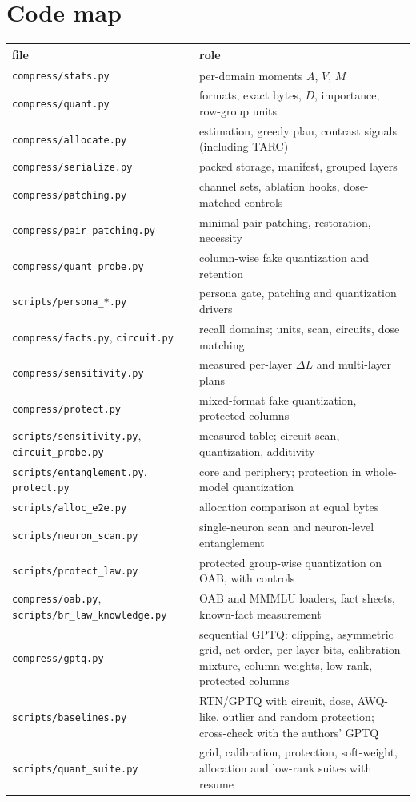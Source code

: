 \documentclass[11pt]{article}
\newcommand{\code}[1]{\texttt{#1}}
\begin{document}
\clearpage
\appendix
\section{Code map}
\begin{center}\small
\begin{tabular}{lp{7.4cm}}
\toprule
file & role\\
\midrule
\code{compress/stats.py} & per-domain moments $A$, $V$, $M$\\
\code{compress/quant.py} & formats, exact bytes, $D$, importance, row-group units\\
\code{compress/allocate.py} & estimation, greedy plan, contrast signals (including TARC)\\
\code{compress/serialize.py} & packed storage, manifest, grouped layers\\
\code{compress/patching.py} & channel sets, ablation hooks, dose-matched controls\\
\code{compress/pair\_patching.py} & minimal-pair patching, restoration, necessity\\
\code{compress/quant\_probe.py} & column-wise fake quantization and retention\\
\code{scripts/persona\_*.py} & persona gate, patching and quantization drivers\\
\code{compress/facts.py}, \code{circuit.py} & recall domains; units, scan, circuits, dose matching\\
\code{compress/sensitivity.py} & measured per-layer $\Delta L$ and multi-layer plans\\
\code{compress/protect.py} & mixed-format fake quantization, protected columns\\
\code{scripts/sensitivity.py}, \code{circuit\_probe.py} & measured table; circuit scan, quantization, additivity\\
\code{scripts/entanglement.py}, \code{protect.py} & core and periphery; protection in whole-model quantization\\
\code{scripts/alloc\_e2e.py} & allocation comparison at equal bytes\\
\code{scripts/neuron\_scan.py} & single-neuron scan and neuron-level entanglement\\
\code{scripts/protect\_law.py} & protected group-wise quantization on OAB, with controls\\
\code{compress/oab.py}, \code{scripts/br\_law\_knowledge.py} & OAB and MMMLU loaders, fact sheets, known-fact measurement\\
\code{compress/gptq.py} & sequential GPTQ: clipping, asymmetric grid, act-order, per-layer bits, calibration mixture, column weights, low rank, protected columns\\
\code{scripts/baselines.py} & RTN/GPTQ with circuit, dose, AWQ-like, outlier and random protection; cross-check with the authors' GPTQ\\
\code{scripts/quant\_suite.py} & grid, calibration, protection, soft-weight, allocation and low-rank suites with resume\\
\bottomrule
\end{tabular}
\end{center}
\end{document}
